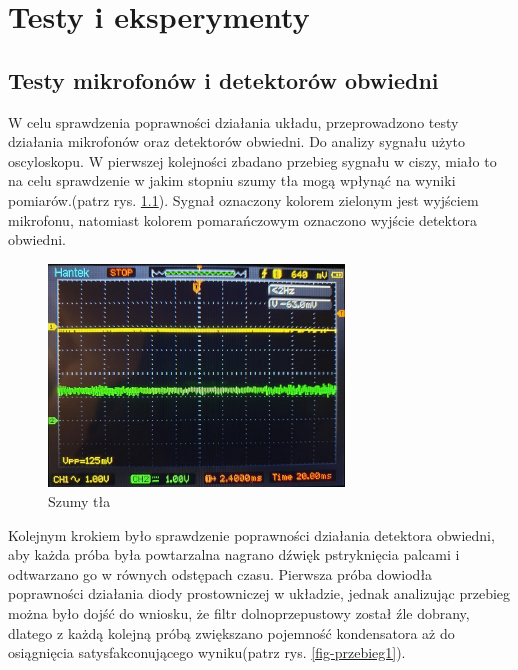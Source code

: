 \documentclass[eng,printmode]{mgr}
\begin{document}
\chapter{Testy i eksperymenty}
\section{Testy mikrofonów i detektorów obwiedni}
W celu sprawdzenia poprawności działania układu, przeprowadzono testy działania mikrofonów oraz detektorów obwiedni. Do analizy sygnału użyto oscyloskopu. W pierwszej kolejności zbadano przebieg sygnału w ciszy, miało to na celu sprawdzenie w jakim stopniu szumy tła mogą wpłynąć na wyniki pomiarów.(patrz rys. \ref{fig-tlo}). Sygnał oznaczony kolorem zielonym jest wyjściem mikrofonu, natomiast kolorem pomarańczowym oznaczono wyjście detektora obwiedni. 
\begin{figure}[ht]

    \centering

  \includegraphics[width=0.7\textwidth, angle=0]{obwiednia_syg2.png}

    \caption{Szumy tła}
 \label{fig-tlo}
    

\end{figure}

Kolejnym krokiem było sprawdzenie poprawności działania detektora obwiedni, aby każda próba była powtarzalna nagrano dźwięk pstryknięcia palcami i odtwarzano go w równych odstępach czasu. Pierwsza próba dowiodła poprawności działania diody prostowniczej w układzie, jednak analizując przebieg można było dojść do wniosku, że filtr dolnoprzepustowy został źle dobrany, dlatego z każdą kolejną próbą zwiększano pojemność kondensatora aż do osiągnięcia satysfakconującego wyniku(patrz rys. \ref{fig-przebieg1}).
\end{document}
